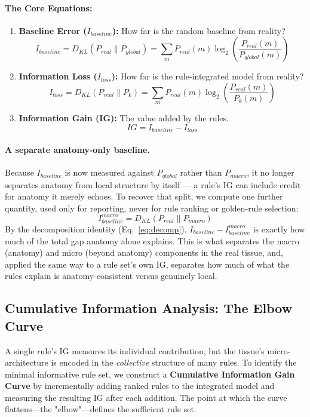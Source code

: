 \documentclass[10pt, a4paper]{article}
\begin{document}
\paragraph{The Core Equations:}
\begin{enumerate}
\item \textbf{Baseline Error ($I_{baseline}$):} How far is the random baseline from reality?
\begin{equation}
I_{baseline} = D_{KL}(P_{real} \parallel P_{global}) = \sum_{m} P_{real}(m) \log_2 \left( \frac{P_{real}(m)}{P_{global}(m)} \right)
\end{equation}
\item \textbf{Information Loss ($I_{loss}$):} How far is the rule-integrated model from reality?
\begin{equation}
I_{loss} = D_{KL}(P_{real} \parallel P_k) = \sum_{m} P_{real}(m) \log_2 \left( \frac{P_{real}(m)}{P_k(m)} \right)
\label{eq:iloss}
\end{equation}
\item \textbf{Information Gain (IG):} The value added by the rules.
\begin{equation}
IG = I_{baseline} - I_{loss}
\end{equation}
\end{enumerate}

\paragraph{A separate anatomy-only baseline.} Because $I_{baseline}$ is now measured against $P_{global}$ rather than $P_{macro}$, it no longer separates anatomy from local structure by itself --- a rule's IG can include credit for anatomy it merely echoes. To recover that split, we compute one further quantity, used only for reporting, never for rule ranking or golden-rule selection:
\begin{equation}
I_{baseline}^{macro} = D_{KL}(P_{real} \parallel P_{macro})
\end{equation}
By the decomposition identity (Eq.~\ref{eq:decomp}), $I_{baseline} - I_{baseline}^{macro}$ is exactly how much of the total gap anatomy alone explains. This is what separates the macro (anatomy) and micro (beyond anatomy) components in the real tissue, and, applied the same way to a rule set's own IG, separates how much of what the rules explain is anatomy-consistent versus genuinely local.

\subsection{Cumulative Information Analysis: The Elbow Curve}
\label{subsec:cumulative}
A single rule's IG measures its individual contribution, but the tissue's micro-architecture is encoded in the \textit{collective} structure of many rules. To identify the minimal informative rule set, we construct a \textbf{Cumulative Information Gain Curve} by incrementally adding ranked rules to the integrated model and measuring the resulting IG after each addition. The point at which the curve flattens—the "elbow"—defines the sufficient rule set.
\end{document}
